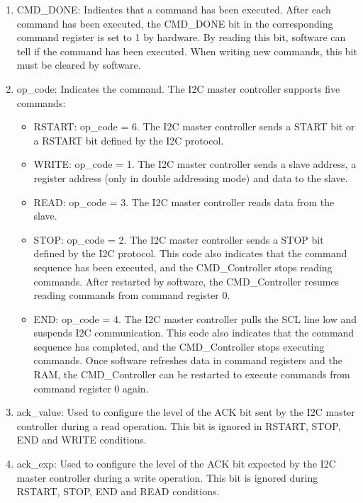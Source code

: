 \documentclass[main\_\_EN.tex]{subfiles}
\begin{document}
\begin{enumerate}

\item CMD\_DONE: Indicates that a command has been executed. After each command has been executed, the CMD\_DONE bit in the corresponding command register is set to 1 by hardware. By reading this bit, software can tell if the command has been executed. When writing new commands, this bit must be cleared by software.

\item op\_code: Indicates the command. The I2C master controller supports five commands:

\begin{itemize}
    \item RSTART: op\_code = 6. The I2C master controller sends a START bit or a RSTART bit defined by the I2C protocol.

    \item WRITE: op\_code = 1. The I2C master controller sends a slave address, a register address  (only in double addressing mode) and data to the slave.

    \item READ: op\_code = 3. The I2C master controller reads data from the slave.

    \item STOP: op\_code = 2. The I2C master controller sends a STOP bit defined by the I2C protocol. This code also indicates that the command sequence has been executed, and the CMD\_Controller stops reading commands. After restarted by software, the CMD\_Controller resumes reading commands from command register 0.

    \item END: op\_code = 4. The I2C master controller pulls the SCL line low and suspends I2C communication. This code also indicates that the command sequence has completed, and the CMD\_Controller stops executing commands. Once software refreshes data in command registers and the RAM, the CMD\_Controller can be restarted to execute commands from command register 0 again.
\end{itemize}

\item ack\_value: Used to configure the level of the ACK bit sent by the I2C master controller during a read operation. This bit is ignored in RSTART, STOP, END and WRITE conditions.

\item ack\_exp: Used to configure the level of the ACK bit expected by the I2C master controller during a write operation. This bit is ignored during RSTART, STOP, END and READ conditions.


\end{enumerate}
\end{document}
